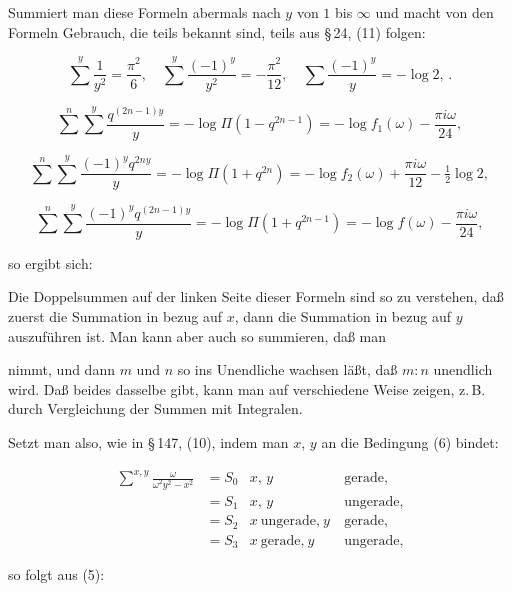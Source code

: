 
Summiert man diese Formeln abermals nach $y$ von $1$ bis $\infty$
und macht von den Formeln Gebrauch, die teils bekannt sind,
teils aus \S\,24, (11) folgen:

\[
\sum^{y}\frac{1}{y^2}=\frac{\pi^2}{6},\quad
\sum^{y}\frac{(-1)^y}{y^2}=-\frac{\pi^2}{12},\quad
\sum\frac{(-1)^y}{y}=-\log 2,\,.
\]

\[
\sum^{n}\sum^{y}\frac{q^{(2n-1)y}}{y}
=-\log\Pi(1-q^{2n-1})=-\log f_1(\omega)-\frac{\pi i\omega}{24},
\]

\[
\sum^{n}\sum^{y}\frac{(-1)^y q^{2ny}}{y}
=-\log\Pi(1+q^{2n})=-\log f_2(\omega)+\frac{\pi i\omega}{12}-\tfrac{1}{2}\log 2,
\]

\[
\sum^{n}\sum^{y}\frac{(-1)^y q^{(2n-1)y}}{y}
=-\log\Pi(1+q^{2n-1})=-\log f(\omega)-\frac{\pi i\omega}{24},
\]

so ergibt sich:


Die Doppelsummen auf der linken Seite dieser Formeln sind
so zu verstehen, daß zuerst die Summation in bezug auf $x$, dann
die Summation in bezug auf $y$ auszuführen ist. Man kann aber
auch so summieren, daß man


nimmt, und dann $m$ und $n$ so ins Unendliche wachsen läßt, daß
$m:n$ unendlich wird. Daß beides dasselbe gibt, kann man auf
verschiedene Weise zeigen, z.\,B. durch Vergleichung der Summen
mit Integralen.

Setzt man also, wie in \S\,147, (10), indem man $x$, $y$ an die
Bedingung (6) bindet:

\[
\begin{aligned}
\sum^{x,y}\frac{\omega}{\omega^2y^2-x^2}&=S_0 & x,\,y&\ \text{gerade,}\\
&=S_1 & x,\,y&\ \text{ungerade,}\\
&=S_2 & x\ \text{ungerade,}\ y&\ \text{gerade,}\\
&=S_3 & x\ \text{gerade,}\ y&\ \text{ungerade,}
\end{aligned}
\]

so folgt aus (5):
